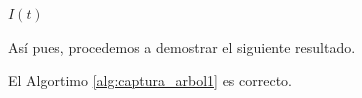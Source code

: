 \begin{algorithm}[!htbp]
{        }
      \caption{\textsc{Captura \'Arbol 1}}
      \label{alg:captura_arbol1}
    \DecMargin{1em}
\end{algorithm}

\begin{algorithm}[!htbp]
    \footnotesize
    \setcounter{AlgoLine}{19}
    \LinesNumberedHidden
    \SetAlgoVlined
    \ShowLn
    {\Return $I(t)$}
    \DecMargin{1em}
\end{algorithm}

\newpage

As\'i pues, procedemos a demostrar el siguiente
resultado.

\begin{teorema}
\label{teo:captura-arbol}
    El Algortimo \ref{alg:captura_arbol1} es correcto.
\end{teorema}

